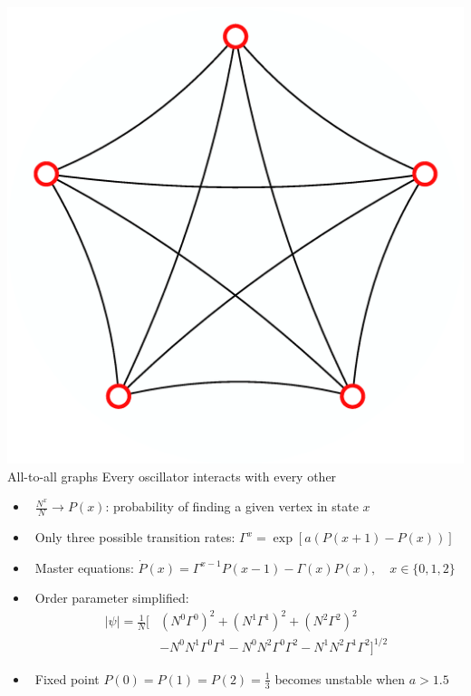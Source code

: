 \documentclass[serif,mathserif]{beamer}
\begin{document}
\begin{frame}{\includegraphics[height=0.06\textheight]{ring-complete-thumb.eps}\hspace{0.25cm} All-to-all graphs}
    Every oscillator interacts with every other
    \begin{itemize}
        \vspace{0.35cm}
        \item \ \pause $\frac{N^x}{N} \rightarrow P(x)$: probability of finding a given vertex in state $x$
        \vspace{0.35cm}
        \item \ \pause Only three possible transition rates: $\Gamma^x = \exp \left[ a (P(x+1) - P(x)) \right]$
        \vspace{0.35cm}
        \item \ \pause Master equations: $\dot P(x) = \Gamma^{x-1}P(x-1) - \Gamma(x)P(x), \quad x \in \{0, 1, 2\}$
        \vspace{0.35cm}
        \item \ \pause Order parameter simplified:\\
        \begin{equation*}
            \begin{split}
                |\psi| = \frac{1}{N} [
                & \left(N^0\Gamma^0\right)^2
                + \left(N^1\Gamma^1\right)^2
                + \left(N^2\Gamma^2\right)^2\\
                & - N^0N^1\Gamma^0\Gamma^1
                - N^0N^2\Gamma^0\Gamma^2
                - N^1N^2\Gamma^1\Gamma^2
            ]^{1/2}
            \end{split}
        \end{equation*}
        \vspace{0.35cm}
        \item \ \pause Fixed point $P(0) = P(1) = P(2) = \frac{1}{3}$ becomes unstable when $a>1.5$
    \end{itemize}
\end{frame}
\end{document}
